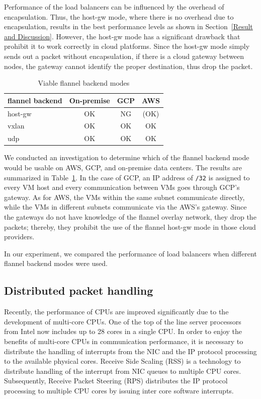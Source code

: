 Performance of the load balancers can be influenced by the overhead of encapsulation. 
Thus, the host-gw mode, where there is no overhead due to encapsulation, 
results in the best performance levels as shown in Section~\ref{Result and Discussion}.
However, the host-gw mode has a significant drawback that prohibit it to work correctly in cloud platforms. 
Since the host-gw mode simply sends out a packet without encapsulation, if there is a cloud gateway between nodes, 
the gateway cannot identify the proper destination, thus drop the packet.

\begin{table}
  \begin{tabular}{lccc}
    \toprule
    flannel backend & On-premise & GCP & AWS \\
    \midrule
    host-gw & OK & NG & (OK) \\
    vxlan & OK & OK & OK \\
    udp & OK & OK & OK \\
    \bottomrule
\end{tabular}

  \caption{Viable flannel backend modes}
  \label{tab:Viable flannel backends}
\end{table}

We conducted an investigation to determine which of the flannel backend mode would be usable on AWS, GCP, and on-premise data centers.
The results are summarized in Table~\ref{tab:Viable flannel backends}. 
In the case of GCP, an IP address of {\tt /32} is assigned to every VM host and 
every communication between VMs goes through GCP's gateway.
As for AWS, the VMs within the same subnet communicate directly, while the VMs in different subnets communicate via the AWS's gateway.
Since the  gateways do not have knowledge of the flannel overlay network, they drop the packets; thereby, 
they prohibit the use of the flannel host-gw mode in those cloud providers.  

In our experiment, we compared the performance of load balancers when different flannel backend modes were used. 

\subsection{Distributed packet handling}

Recently, the performance of CPUs are improved significantly due to the development of multi-core CPUs.
One of the top of the line server processors from Intel now includes up to 28 cores in a single CPU.
In order to enjoy the benefits of multi-core CPUs in communication performance, 
it is necessary to distribute the handling of interrupts from the NIC and the IP protocol processing
to the available physical cores.
Receive Side Scaling (RSS)\cite{TomHerbert} is a technology 
to distribute handling of the interrupt from NIC queues to multiple CPU cores.
Subsequently, Receive Packet Steering (RPS)\cite{TomHerbert} distributes the IP protocol processing 
to multiple CPU cores by issuing inter core software interrupts.

